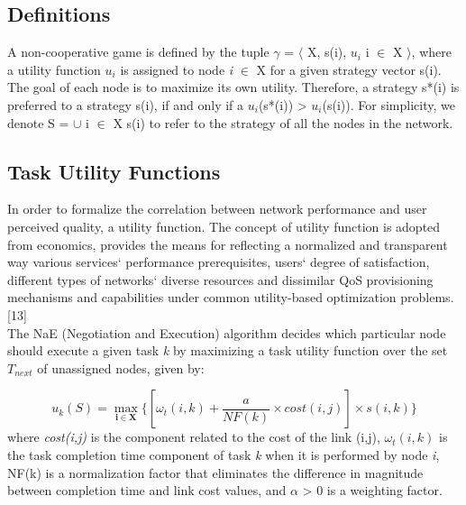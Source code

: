 \documentclass[a4paper]{article}
\begin{document}
\subsection{Definitions}
A non-cooperative game is defined by the tuple $\gamma$ = $\langle$ X, {s(i), $u_i$} i $\in$ X $\rangle$, where a utility function $u_i$ is assigned to node \textit{i} $\in$ X for a given strategy vector s(i). The goal of each node is to maximize its own utility. Therefore, a strategy s*(i) is preferred to a strategy s(i), if and only if a $u_i$(s*(i)) > $u_i$(s(i)). For simplicity, we denote S = $\cup$ i $\in$ X s(i) to refer to the strategy of all the nodes in the network. 


\subsection{Task Utility Functions}
In order to formalize the correlation between network performance and user perceived quality, a utility function. The concept of utility function is adopted from economics, provides the means for reflecting a normalized and transparent way various services` performance prerequisites, users` degree of satisfaction, different types of networks` diverse resources and dissimilar QoS provisioning mechanisms and capabilities under common utility-based optimization problems. [13] \\ %
The NaE (Negotiation and Execution) algorithm decides which particular node should execute a given task \textit{k} by maximizing a task utility function over the set $T_{next}$ of unassigned nodes, given by:

\begin{equation}%
u_k (S) = \max_{\mathbf{i} \in \mathbf{X}} \{[\omega_t(i,k) + \frac{a}{NF(k)} \times cost(i,j)] \times s(i,k)\}
\end{equation}
where \textit{cost(i,j)} is the component related to the cost of the link (i,j), $\omega_t(i,k)$ is the task completion time component of task \textit{k} when it is performed by node \textit{i}, NF(k) is a normalization factor that eliminates the difference in magnitude between completion time and link cost values, and $\alpha$ > 0 is a weighting factor. \\
\end{document}
